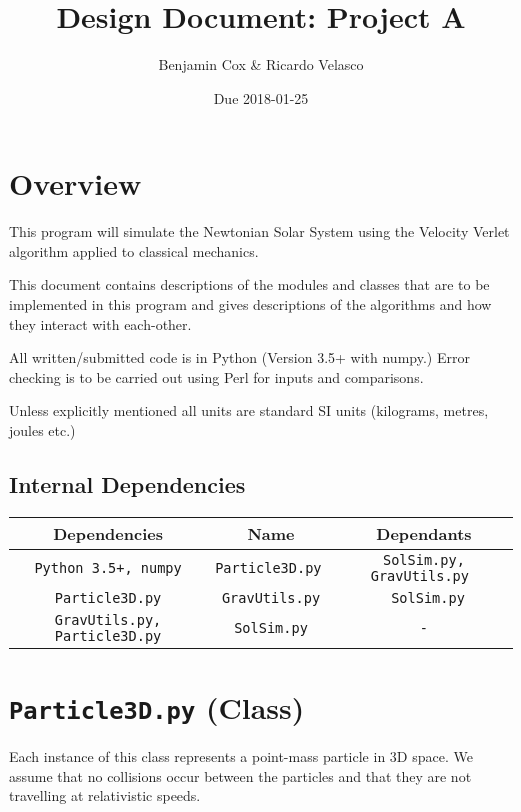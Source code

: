 \documentclass[a4paper, 11pt, british, left=1in, right=1in, top=0.3in, bottom=1in]{article}
\author{Benjamin Cox \& Ricardo Velasco}
\title{Design Document: Project A}
\date{Due 2018-01-25}
\begin{document}
	{\maketitle}
	
	\tableofcontents
	
	\pagebreak
	\section{Overview}
	
	This program will simulate the Newtonian Solar System using the Velocity Verlet algorithm applied to classical mechanics. 
	
	This document contains descriptions of the modules and classes that are to be implemented in this program and gives descriptions of the algorithms and how they interact with each-other. 
	
	All written/submitted code is in Python (Version 3.5+ with numpy.) Error checking is to be carried out using Perl for inputs and comparisons. 
	
	Unless explicitly mentioned all units are standard SI units (kilograms, metres, joules etc.)
	
	
	\subsection{Internal Dependencies}
	\begin{tabular}{|c|c|c|}
		\hline \rowcolor{NavyBlue} Dependencies & Name & Dependants \\ 
		\hline \texttt{Python 3.5+, numpy} & \texttt{Particle3D.py }& \texttt{SolSim.py, GravUtils.py }\\ 
		\hline \texttt{Particle3D.py} & \texttt{GravUtils.py} &\texttt{ SolSim.py} \\ 
		\hline \texttt{GravUtils.py, Particle3D.py} & \texttt{SolSim.py} & \texttt{-} \\ 
		\hline 
	\end{tabular} 
	\pagebreak
	
	\section{\texttt{Particle3D.py} (Class)}
	
	Each instance of this class represents a point-mass particle in 3D space. We assume that no collisions occur between the particles and that they are not travelling at relativistic speeds. 
	
\end{document}
